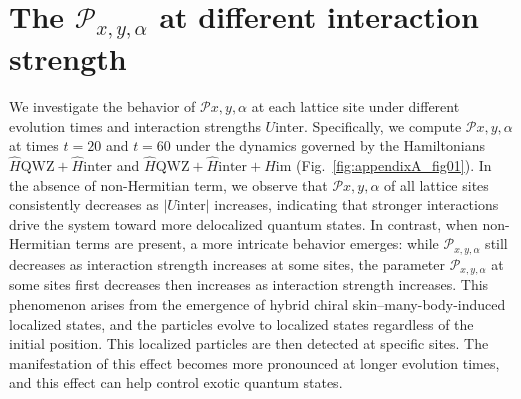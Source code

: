 \documentclass[longbibliography, aps, prx, amsmath, amssymb, amsfonts, twocolumn,superscriptaddress, footinbib]{revtex4-1}
\begin{document}
	\appendix

	\section{The $\mathcal{P}_{x,y,\alpha}$ at different interaction strength~\label{sec:AllP}}


	We investigate the behavior of $\mathcal{P}{x,y,\alpha}$ at each lattice site under different evolution times and interaction strengths $U{\text{inter}}$. Specifically, we compute $\mathcal{P}{x,y,\alpha}$ at times $t = 20$ and $t = 60$ under the dynamics governed by the Hamiltonians $\hat{H}{\text{QWZ}} + \hat{H}{\text{inter}}$ and $\hat{H}{\text{QWZ}} + \hat{H}{\text{inter}} + \hat{H}{\text{im}}$ (Fig.~\ref{fig:appendixA_fig01}). 
	In the absence of non-Hermitian term, we observe that $\mathcal{P}{x,y,\alpha}$ of all lattice sites consistently decreases as $\lvert U{\text{inter}} \rvert$ increases, indicating that stronger interactions drive the system toward more delocalized quantum states. 
	In contrast, when non-Hermitian terms are present, a more intricate behavior emerges: while $\mathcal{P}_{x,y,\alpha}$ still decreases as interaction strength increases at some sites, 
	the parameter $\mathcal{P}_{x,y,\alpha}$ at some sites first decreases then increases as interaction strength increases.
	This phenomenon arises from the emergence of hybrid chiral skin–many-body-induced localized states, and the particles evolve to localized states regardless of the initial position. This localized particles are then detected at specific sites. The manifestation of this effect becomes more pronounced at longer evolution times, and this effect can help control exotic quantum states.
\end{document}

